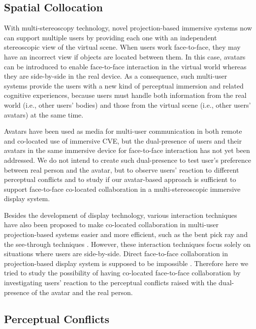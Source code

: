 \subsection{Spatial Collocation}
With multi-stereoscopy technology, novel projection-based immersive systems now can support multiple users by providing each one with an independent stereoscopic view of the virtual scene. When users work face-to-face, they may have an incorrect view if objects are located between them. In this case, avatars can be introduced to enable face-to-face interaction in the virtual world whereas they are side-by-side in the real device. As a consequence, such multi-user systems provide the users with a new kind of perceptual immersion and related cognitive experiences, because users must handle both information from the real world (i.e., other users' bodies) and those from the virtual scene (i.e., other users' avatars) at the same time.

Avatars have been used as media for multi-user communication in both remote and co-located use of immersive CVE, but the dual-presence of users and their avatars in the same immersive device for face-to-face interaction has not yet been addressed. We do not intend to create such dual-presence to test user's preference between real person and the avatar, but to observe users' reaction to different perceptual conflicts and to study if our avatar-based approach is sufficient to support face-to-face co-located collaboration in a multi-stereoscopic immersive display system.

Besides the development of display technology, various interaction techniques have also been proposed to make co-located collaboration in multi-user projection-based systems easier and more efficient, such as the bent pick ray \citep{Riege2006Bent} and the see-through techniques \citep{Argelaguet2010STT}. However, these interaction techniques focus solely on situations where users are side-by-side. Direct face-to-face collaboration in projection-based display system is supposed to be impossible \citep{Salzmann2009CIC}. Therefore here we tried to study the possibility of having co-located face-to-face collaboration by investigating users' reaction to the perceptual conflicts raised with the dual-presence of the avatar and the real person.


\subsection{Perceptual Conflicts}


